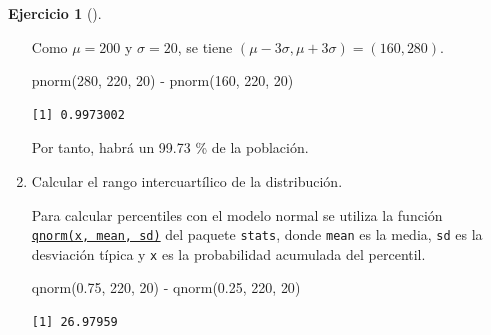 \documentclass[
  a4paper,
]{scrreport}
\newenvironment{Shaded}{\begin{snugshade}}{\end{snugshade}}
\newcommand{\DecValTok}[1]{\textcolor[rgb]{0.68,0.00,0.00}{#1}}
\newcommand{\FloatTok}[1]{\textcolor[rgb]{0.68,0.00,0.00}{#1}}
\newcommand{\FunctionTok}[1]{\textcolor[rgb]{0.28,0.35,0.67}{#1}}
\newcommand{\NormalTok}[1]{\textcolor[rgb]{0.00,0.23,0.31}{#1}}
\newcommand{\SpecialCharTok}[1]{\textcolor[rgb]{0.37,0.37,0.37}{#1}}
\theoremstyle{definition}
\newtheorem{exercise}{Ejercicio}[chapter]
\theoremstyle{remark}
\begin{document}
\begin{exercise}[]
\begin{enumerate}
\begin{tcolorbox}
  Como \(\mu=200\) y \(\sigma=20\), se tiene
  \((\mu-3\sigma, \mu+3\sigma) = (160, 280)\).

\begin{Shaded}
\begin{Highlighting}[]
\FunctionTok{pnorm}\NormalTok{(}\DecValTok{280}\NormalTok{, }\DecValTok{220}\NormalTok{, }\DecValTok{20}\NormalTok{) }\SpecialCharTok{{-}} \FunctionTok{pnorm}\NormalTok{(}\DecValTok{160}\NormalTok{, }\DecValTok{220}\NormalTok{, }\DecValTok{20}\NormalTok{)}
\end{Highlighting}
\end{Shaded}

\begin{verbatim}
[1] 0.9973002
\end{verbatim}

  Por tanto, habrá un 99.73 \% de la población.

  \end{tcolorbox}
\item
  Calcular el rango intercuartílico de la distribución.

  \begin{tcolorbox}[enhanced jigsaw, coltitle=black, left=2mm, colback=white, leftrule=.75mm, toptitle=1mm, breakable, bottomrule=.15mm, titlerule=0mm, bottomtitle=1mm, title=\textcolor{quarto-callout-tip-color}{\faLightbulb}\hspace{0.5em}{Solución}, arc=.35mm, toprule=.15mm, rightrule=.15mm, colframe=quarto-callout-tip-color-frame, opacityback=0, colbacktitle=quarto-callout-tip-color!10!white, opacitybacktitle=0.6]

  Para calcular percentiles con el modelo normal se utiliza la función
  \href{https://www.rdocumentation.org/packages/stats/versions/3.3/topics/Normal}{\texttt{qnorm(x,\ mean,\ sd)}}
  del paquete \texttt{stats}, donde \texttt{mean} es la media,
  \texttt{sd} es la desviación típica y \texttt{x} es la probabilidad
  acumulada del percentil.

\begin{Shaded}
\begin{Highlighting}[]
\FunctionTok{qnorm}\NormalTok{(}\FloatTok{0.75}\NormalTok{, }\DecValTok{220}\NormalTok{, }\DecValTok{20}\NormalTok{) }\SpecialCharTok{{-}} \FunctionTok{qnorm}\NormalTok{(}\FloatTok{0.25}\NormalTok{, }\DecValTok{220}\NormalTok{, }\DecValTok{20}\NormalTok{)}
\end{Highlighting}
\end{Shaded}

\begin{verbatim}
[1] 26.97959
\end{verbatim}

  \end{tcolorbox}
\end{enumerate}

\end{exercise}
\end{document}
